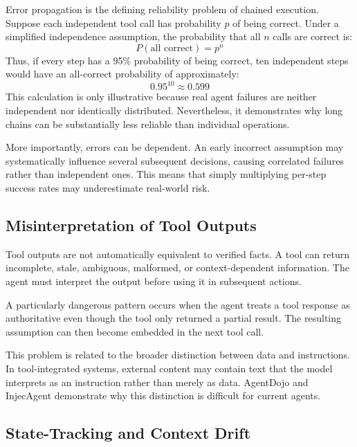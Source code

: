\documentclass[11pt]{article}
\begin{document}
Error propagation is the defining reliability problem of chained execution.
Suppose each independent tool call has probability $p$ of being correct. Under a
simplified independence assumption, the probability that all $n$ calls are correct is:
\begin{equation}
P(\text{all correct}) = p^n
\label{eq:allcorrect}
\end{equation}
Thus, if every step has a 95\% probability of being correct, ten independent
steps would have an all-correct probability of approximately:
\begin{equation}
0.95^{10} \approx 0.599
\label{eq:example}
\end{equation}
This calculation is only illustrative because real agent failures are neither
independent nor identically distributed. Nevertheless, it demonstrates why long
chains can be substantially less reliable than individual operations.

More importantly, errors can be dependent. An early incorrect assumption may
systematically influence several subsequent decisions, causing correlated failures
rather than independent ones. This means that simply multiplying per-step success
rates may underestimate real-world risk.

\subsection{Misinterpretation of Tool Outputs}

Tool outputs are not automatically equivalent to verified facts. A tool can
return incomplete, stale, ambiguous, malformed, or context-dependent
information. The agent must interpret the output before using it in subsequent
actions.

A particularly dangerous pattern occurs when the agent treats a tool response as
authoritative even though the tool only returned a partial result. The resulting
assumption can then become embedded in the next tool call.

This problem is related to the broader distinction between data and instructions. In
tool-integrated systems, external content may contain text that the model interprets
as an instruction rather than merely as data. AgentDojo and InjecAgent demonstrate
why this distinction is difficult for current agents.

\subsection{State-Tracking and Context Drift}
\end{document}
